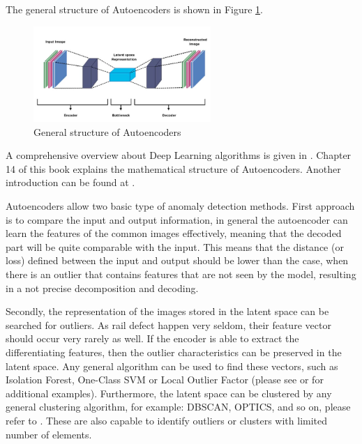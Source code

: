The general structure of Autoencoders is shown in Figure \ref{fig:autoencoder}.

\begin{figure}[!ht]
    \centering
    \includegraphics[width=0.6\textwidth,trim={0 0 0 1cm},clip]{./tex_images/autoencoder.jpeg}
    \caption{General structure of Autoencoders \cite{khosla_auto_2021}}
    \label{fig:autoencoder}
\end{figure}

A comprehensive overview about Deep Learning algorithms is given in \cite{Goodfellow-et-al-2016}.
Chapter 14 of this book explains the mathematical structure of Autoencoders.
Another introduction can be found at \cite{_autoencoder_2023}.

Autoencoders allow two basic type of anomaly detection methods.
First approach is to compare the input and output information, in general the autoencoder
can learn the features of the common images effectively, meaning that the decoded part will
be quite comparable with the input.
This means that the distance (or loss) defined between the input and output should be lower than
the case, when there is an outlier that contains features that are not seen by the model,
resulting in a not precise decomposition and decoding.

Secondly, the representation of the images stored in the latent space can be searched for outliers.
As rail defect happen very seldom, their feature vector should occur very rarely as well.
If the encoder is able to extract the differentiating features, then the outlier characteristics
can be preserved in the latent space.
Any general algorithm can be used to find these vectors, such as Isolation Forest, One-Class SVM or
Local Outlier Factor (please see \cite{_anomaly_2023} or \cite{sklearn_outlier_detection}
for additional examples).
Furthermore, the latent space can be clustered by any general clustering algorithm, for example:
DBSCAN, OPTICS, and so on, please refer to \cite{sklearn_clustering}.
These are also capable to identify outliers or clusters with limited number of elements.

